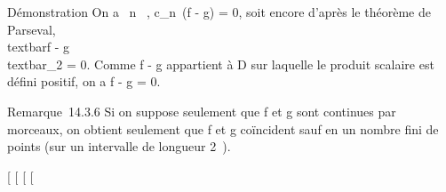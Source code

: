 \documentclass[]{article}
\begin{document}
Démonstration On a \forall~n \in {}~, c\_n~(f - g)
= 0, soit encore d'après le théorème de Parseval,
\\textbar{}f - g\\textbar{}\_2 =
0. Comme f - g appartient à D sur laquelle le produit scalaire est
défini positif, on a f - g = 0.

Remarque~14.3.6 Si on suppose seulement que f et g sont continues par
morceaux, on obtient seulement que f et g coïncident sauf en un nombre
fini de points (sur un intervalle de longueur 2\pi~).

{[}
{[}
{[}
{[}
\end{document}
